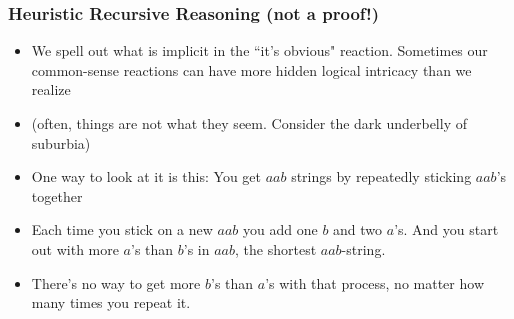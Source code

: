 \begin{frame}
\frametitle{Heuristic Recursive Reasoning (not a proof!)}

\begin{itemize}[<+->]
\item We spell out what is implicit in the ``it's obvious" reaction. Sometimes our common-sense reactions can have more hidden logical intricacy than we realize 

\item (often, things are not what they seem. Consider the dark underbelly of suburbia) 

\item One way to look at it is this: You get $aab$ strings by repeatedly sticking $aab$'s together

\item Each time you stick on a new $aab$ you add one $b$ and two $a$'s. And you start out with more $a$'s than $b$'s in $aab$, the shortest $aab$-string.

\item There's no way to get more $b$'s than $a$'s with that process, no matter how many times you repeat it.


\end{itemize} 
\end{frame}


